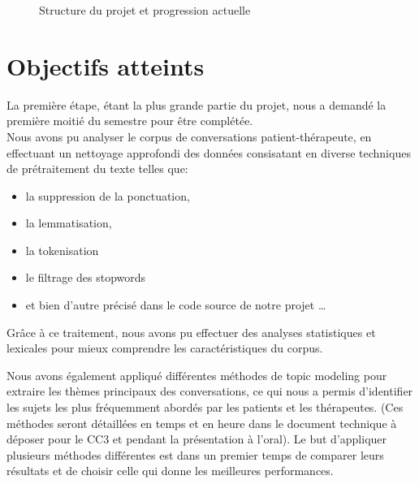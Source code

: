 \documentclass[12pt,a4paper]{article}
\begin{document}
\begin{figure}[H]
\begin{center}
\caption{\centering\small Structure du projet et progression actuelle}
\end{center}
\end{figure}

\pagebreak
\section{Objectifs atteints}

\hspace*{1cm}La première étape, étant la plus grande partie du projet, nous a demandé la première moitié du semestre pour être complétée.\\
Nous avons pu analyser le corpus de conversations patient-thérapeute, en effectuant un nettoyage approfondi des données consisatant en 
diverse techniques de prétraitement du texte telles que: 
\begin{itemize}
    \item la suppression de la ponctuation, 
    \item la lemmatisation, 
    \item la tokenisation 
    \item le filtrage des stopwords
    \item et bien d'autre précisé dans le code source de notre projet \dots
\end{itemize}
Grâce à ce traitement, nous avons pu effectuer des analyses statistiques et 
lexicales pour mieux comprendre les caractéristiques du corpus.\smallbreak

Nous avons également appliqué différentes méthodes de topic modeling pour extraire les thèmes principaux des conversations,
ce qui nous a permis d'identifier les sujets les plus fréquemment abordés par les patients et les thérapeutes. 
(Ces méthodes seront détaillées en temps et en heure dans le document technique à déposer pour le CC3 et pendant la présentation à l'oral).
Le but d'appliquer plusieurs méthodes différentes est dans un premier temps de comparer leurs résultats et de choisir celle qui donne les meilleures performances.\smallbreak
\end{document}
